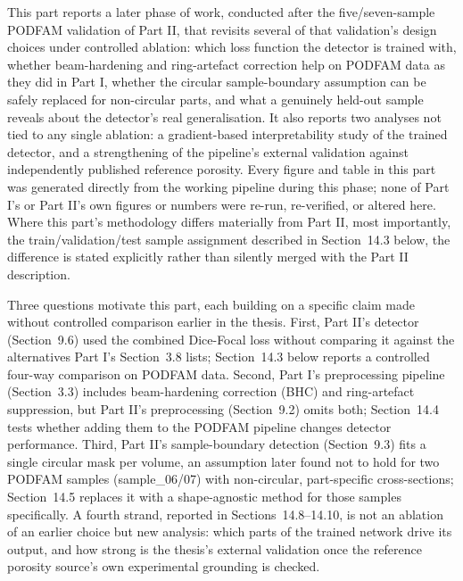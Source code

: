 This part reports a later phase of work, conducted after the five/seven-sample PODFAM validation of
Part II, that revisits several of that validation's design choices under controlled ablation: which
loss function the detector is trained with, whether beam-hardening and ring-artefact correction help
on PODFAM data as they did in Part I, whether the circular sample-boundary assumption can be safely
replaced for non-circular parts, and what a genuinely held-out sample reveals about the detector's
real generalisation. It also reports two analyses not tied to any single ablation: a gradient-based
interpretability study of the trained detector, and a strengthening of the pipeline's external
validation against independently published reference porosity. Every figure and table in this part
was generated directly from the working pipeline during this phase; none of Part I's or Part II's own
figures or numbers were re-run, re-verified, or altered here. Where this part's methodology differs
materially from Part II, most importantly, the train/validation/test sample assignment described in
Section~14.3 below, the difference is stated explicitly rather than silently merged with the Part II
description.


Three questions motivate this part, each building on a specific claim made without controlled
comparison earlier in the thesis. First, Part II's detector (Section~9.6) used the combined Dice-Focal
loss without comparing it against the alternatives Part I's Section~3.8 lists; Section~14.3 below
reports a controlled four-way comparison on PODFAM data. Second, Part I's preprocessing pipeline
(Section~3.3) includes beam-hardening correction (BHC) and ring-artefact suppression, but Part II's
preprocessing (Section~9.2) omits both; Section~14.4 tests whether adding them to the PODFAM pipeline
changes detector performance. Third, Part II's sample-boundary detection (Section~9.3) fits a single
circular mask per volume, an assumption later found not to hold for two PODFAM samples
(sample\_06/07) with non-circular, part-specific cross-sections; Section~14.5 replaces it with a
shape-agnostic method for those samples specifically. A fourth strand, reported in
Sections~14.8--14.10, is not an ablation of an earlier choice but new analysis: which parts of the
trained network drive its output, and how strong is the thesis's external validation once the
reference porosity source's own experimental grounding is checked.

